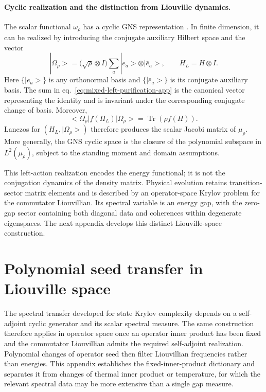 \documentclass[a4paper,11pt]{article}
\def\ket#1{|#1>}%
\def\bra#1{<#1|}%
\theoremstyle{definition}
\theoremstyle{remark}
\newcommand{\ket}[1]{|#1\rangle}
\newcommand{\bra}[1]{\langle #1|}
\begin{document}
\paragraph{Cyclic realization and the distinction from Liouville dynamics.}
The scalar functional $\omega_\rho$ has a cyclic GNS representation
\cite{BratteliRobinson1987}.  In finite dimension, it can be realized by
introducing the conjugate auxiliary Hilbert space and the vector
\begin{equation}
   \ket{\Omega_\rho}
   =\bigl(\sqrt\rho\otimes I\bigr)
      \sum_a\ket{e_a}\otimes\ket{\bar e_a},
   \qquad
   H_L=H\otimes I.
   \label{eq:mixed-left-purification-app}
\end{equation}
Here $\{\ket{e_a}\}$ is any orthonormal basis and
$\{\ket{\bar e_a}\}$ is its conjugate auxiliary basis.  The sum in
eq.~\eqref{eq:mixed-left-purification-app} is the canonical vector
representing the identity and is invariant under the corresponding
conjugate change of basis.  Moreover,
\begin{equation}
   \bra{\Omega_\rho}f(H_L)\ket{\Omega_\rho}
   =\operatorname{Tr}\!\left(\rho f(H)\right).
   \label{eq:mixed-purification-functional-app}
\end{equation}
Lanczos for $(H_L,\ket{\Omega_\rho})$ therefore produces the scalar
Jacobi matrix of $\mu_\rho$.  More generally, the GNS cyclic space is the
closure of the polynomial subspace in $L^2(\mu_\rho)$, subject to the
standing moment and domain assumptions.

This left-action realization encodes the energy functional; it is not
the conjugation dynamics of the density matrix.  Physical evolution
retains transition-sector matrix elements and is described by an
operator-space Krylov problem for the commutator Liouvillian.  Its
spectral variable is an energy gap, with the zero-gap sector containing
both diagonal data and coherences within degenerate eigenspaces.  The
next appendix develops this distinct Liouville-space construction.

\section{Polynomial seed transfer in Liouville space}
\label{app:operator-krylov}

The spectral transfer developed for state Krylov complexity depends on a
self-adjoint cyclic generator and its scalar spectral measure.  The same
construction therefore applies in operator space once an operator inner
product has been fixed and the commutator Liouvillian admits the required
self-adjoint realization.  Polynomial changes of operator seed then
filter Liouvillian frequencies rather than energies.  This appendix
establishes the fixed-inner-product dictionary and separates it from
changes of thermal inner product or temperature, for which the relevant
spectral data may be more extensive than a single gap measure.
\end{document}
